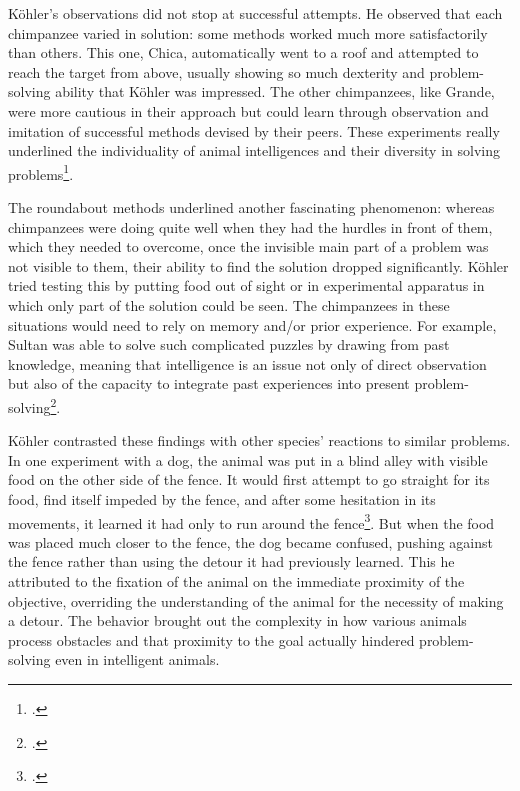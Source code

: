\documentclass[12pt]{article}
\begin{document}
Köhler's observations did not stop at successful attempts. He observed that each chimpanzee varied in solution: some methods worked much more satisfactorily than others. This one, Chica, automatically went to a roof and attempted to reach the target from above, usually showing so much dexterity and problem-solving ability that Köhler was impressed. The other chimpanzees, like Grande, were more cautious in their approach but could learn through observation and imitation of successful methods devised by their peers. These experiments really underlined the individuality of animal intelligences and their diversity in solving problems\footcite{koehler1921mentality}.

The roundabout methods underlined another fascinating phenomenon: whereas chimpanzees were doing quite well when they had the hurdles in front of them, which they needed to overcome, once the invisible main part of a problem was not visible to them, their ability to find the solution dropped significantly. Köhler tried testing this by putting food out of sight or in experimental apparatus in which only part of the solution could be seen. The chimpanzees in these situations would need to rely on memory and/or prior experience. For example, Sultan was able to solve such complicated puzzles by drawing from past knowledge, meaning that intelligence is an issue not only of direct observation but also of the capacity to integrate past experiences into present problem-solving\footcite{koehler1921mentality}.

Köhler contrasted these findings with other species' reactions to similar problems. In one experiment with a dog, the animal was put in a blind alley with visible food on the other side of the fence. It would first attempt to go straight for its food, find itself impeded by the fence, and after some hesitation in its movements, it learned it had only to run around the fence\footcite{morgan1894animal}. But when the food was placed much closer to the fence, the dog became confused, pushing against the fence rather than using the detour it had previously learned. This he attributed to the fixation of the animal on the immediate proximity of the objective, overriding the understanding of the animal for the necessity of making a detour. The behavior brought out the complexity in how various animals process obstacles and that proximity to the goal actually hindered problem-solving even in intelligent animals.
\end{document}
